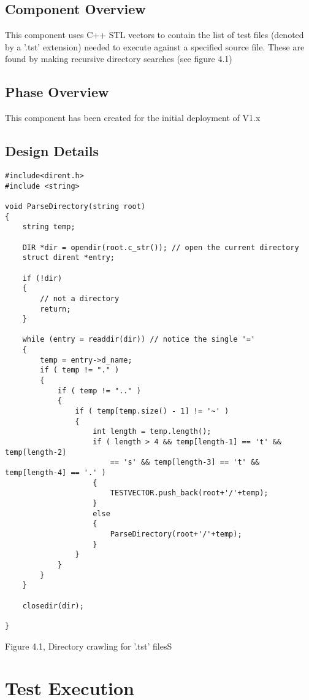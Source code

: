 \subsection {Component Overview}
This component uses C++ STL vectors to contain the list of test files (denoted by a '.tst' extension) needed to execute against a specified source file.  These are found by making recursive directory searches (see figure 4.1)

\subsection {Phase Overview}
This component has been created for the initial deployment of V1.x

\subsection{Design Details}
\begin{lstlisting}
#include<dirent.h>
#include <string>

void ParseDirectory(string root)
{  
    string temp;

    DIR *dir = opendir(root.c_str()); // open the current directory
    struct dirent *entry;

    if (!dir)
    {
        // not a directory
        return;
    }

    while (entry = readdir(dir)) // notice the single '='
    {
        temp = entry->d_name;
        if ( temp != "." )
        {
            if ( temp != ".." )
            {
                if ( temp[temp.size() - 1] != '~' )
                {
                    int length = temp.length();
                    if ( length > 4 && temp[length-1] == 't' && temp[length-2] 
                        == 's' && temp[length-3] == 't' && temp[length-4] == '.' )
                    {
                        TESTVECTOR.push_back(root+'/'+temp);
                    }
                    else
                    {
                        ParseDirectory(root+'/'+temp);
                    }
                }
            }
        }
    }
    
    closedir(dir);

}
\end{lstlisting}
Figure 4.1, Directory crawling for '.tst' filesS

\section{Test Execution }

